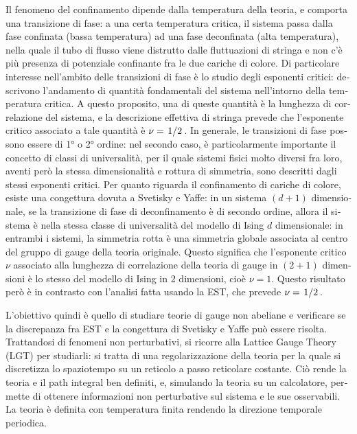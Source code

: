\documentclass[reqno,11pt]{article}
\numberwithin{equation}{section}
\begin{document}
\begin{otherlanguage}{italian}
Il fenomeno del confinamento dipende dalla temperatura della teoria, e comporta una transizione di fase: a una certa 
temperatura critica, il sistema passa dalla fase confinata (bassa temperatura) ad una fase deconfinata (alta
temperatura), nella quale il tubo di flusso viene distrutto dalle fluttuazioni di stringa e non c'è più presenza
di potenziale confinante fra le due cariche di colore. Di particolare interesse nell'ambito delle transizioni di fase
è lo studio degli esponenti critici: descrivono l'andamento di quantità fondamentali del sistema nell'intorno della 
temperatura critica. A questo proposito, una di queste quantità è la lunghezza di correlazione del sistema, e la descrizione
effettiva di stringa prevede che l'esponente critico associato a tale quantità è $\nu = \flatfrac{1}{2}$. In generale,
le transizioni di fase possono essere di 1° o 2° ordine: nel secondo caso, è particolarmente importante il concetto
di classi di universalità, per il quale sistemi fisici molto diversi fra loro, aventi però la stessa dimensionalità e
rottura di simmetria, sono descritti dagli stessi esponenti critici. Per quanto riguarda il confinamento di cariche di
colore, esiste una congettura dovuta a Svetisky e Yaffe: in un sistema $(d+1)$ dimensionale, se la transizione 
di fase di deconfinamento è di secondo ordine, allora il sistema è nella stessa classe di universalità del modello di
Ising $d$ dimensionale: in entrambi i sistemi, la simmetria rotta è una simmetria globale associata al centro del gruppo
di gauge della teoria originale. Questo significa che l'esponente critico $\nu$ associato alla lunghezza di
correlazione della teoria di gauge in $(2+1)$ dimensioni è lo stesso del modello di Ising in 2 dimensioni, cioè
$\nu = 1$. Questo risultato però è in contrasto con l'analisi fatta usando la EST, che prevede $\nu = \flatfrac{1}{2}$.

L'obiettivo quindi è quello di studiare teorie di gauge non abeliane e verificare se la discrepanza fra EST e la
congettura di Svetisky e Yaffe può essere risolta. Trattandosi di fenomeni non perturbativi, si ricorre alla Lattice Gauge
Theory (LGT) per studiarli: si tratta di una regolarizzazione della teoria per la quale si discretizza lo spaziotempo
su un reticolo a passo reticolare costante. Ciò rende la teoria e il path integral ben definiti, e, simulando la teoria
su un calcolatore, permette di ottenere informazioni non perturbative sul sistema e le sue osservabili. La teoria è definita
con temperatura finita rendendo la direzione temporale periodica. 


\end{otherlanguage}
\end{document}
